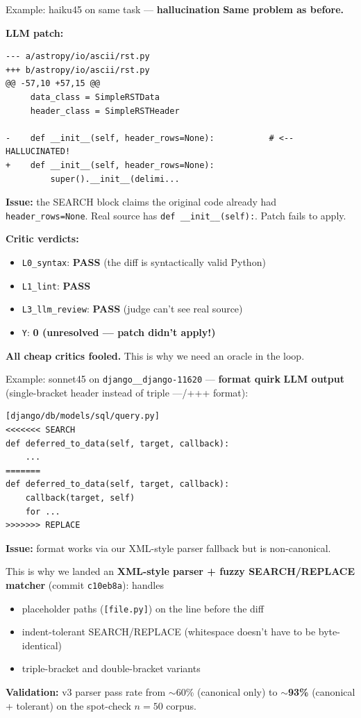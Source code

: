 \documentclass[10pt]{beamer}
\newcommand{\good}[1]{\textcolor{accentGreen}{\textbf{#1}}}
\newcommand{\bad}[1]{\textcolor{accentRed}{\textbf{#1}}}
\newcommand{\warn}[1]{\textcolor{accentOrange}{\textbf{#1}}}
\newcommand{\info}[1]{\textcolor{primaryBlue}{\textbf{#1}}}
\begin{document}
\begin{frame}[fragile]{Example: haiku45 on same task --- \bad{hallucination}}
\info{Same problem as before.}

\info{LLM patch:}
\begin{lstlisting}[basicstyle=\ttfamily\tiny]
--- a/astropy/io/ascii/rst.py
+++ b/astropy/io/ascii/rst.py
@@ -57,10 +57,15 @@
     data_class = SimpleRSTData
     header_class = SimpleRSTHeader

-    def __init__(self, header_rows=None):           # <-- HALLUCINATED!
+    def __init__(self, header_rows=None):
         super().__init__(delimi...
\end{lstlisting}

\bad{Issue:} the SEARCH block claims the original code already had
\texttt{header\_rows=None}. Real source has \texttt{def \_\_init\_\_(self):}.
Patch fails to apply.

\info{Critic verdicts:}
\begin{itemize}
\item \texttt{L0\_syntax}: \good{PASS} (the diff is syntactically valid Python)
\item \texttt{L1\_lint}: \good{PASS}
\item \texttt{L3\_llm\_review}: \good{PASS} (judge can't see real source)
\item \texttt{Y}: \bad{0 (unresolved --- patch didn't apply!)}
\end{itemize}
\bad{All cheap critics fooled.} This is why we need an oracle in the loop.
\end{frame}

\begin{frame}[fragile]{Example: sonnet45 on \texttt{django\_\_django-11620} --- \warn{format quirk}}
\info{LLM output} (single-bracket header instead of triple ---/+++ format):
\begin{lstlisting}[basicstyle=\ttfamily\tiny]
[django/db/models/sql/query.py]
<<<<<<< SEARCH
def deferred_to_data(self, target, callback):
    ...
=======
def deferred_to_data(self, target, callback):
    callback(target, self)
    for ...
>>>>>>> REPLACE
\end{lstlisting}

\warn{Issue:} format works via our XML-style parser fallback but is non-canonical.

This is why we landed an \textbf{XML-style parser + fuzzy SEARCH/REPLACE matcher}
(commit \texttt{c10eb8a}): handles
\begin{itemize}
\item \textcolor{accentTeal}{placeholder paths} (\texttt{[file.py]}) on the
line before the diff
\item \textcolor{accentTeal}{indent-tolerant SEARCH/REPLACE} (whitespace
doesn't have to be byte-identical)
\item \textcolor{accentTeal}{triple-bracket and double-bracket variants}
\end{itemize}
\good{Validation:} v3 parser pass rate from $\sim$60\% (canonical only) to
\good{$\sim$93\%} (canonical + tolerant) on the spot-check $n=50$ corpus.
\end{frame}
\end{document}
